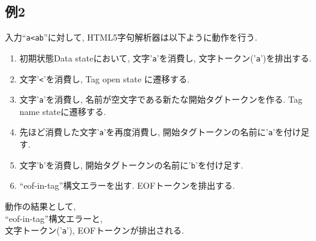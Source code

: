 \documentclass[uplatex,a4j]{jsreport}
\begin{document}
\subsection{例2}
入力``\texttt{a<ab}''に対して, HTML5字句解析器は以下ように動作を行う.\\
\begin{enumerate}
    \item 初期状態Data stateにおいて, 文字'\texttt{a}'を消費し, 文字トークン('\texttt{a}')を排出する.
    \item 文字'\texttt{<}'を消費し, Tag open state に遷移する.
    \item 文字'\texttt{a}'を消費し, 名前が空文字である新たな開始タグトークンを作る. Tag name stateに遷移する.
    \item 先ほど消費した文字'\texttt{a}'を再度消費し, 開始タグトークンの名前に'\texttt{a}'を付け足す.
    \item 文字'\texttt{b}'を消費し, 開始タグトークンの名前に'\texttt{b}'を付け足す.
    \item ``eof-in-tag''構文エラーを出す. EOFトークンを排出する.
\end{enumerate}
動作の結果として,\\
``eof-in-tag''構文エラーと, \\
文字トークン('\texttt{a}'), EOFトークンが排出される.
\end{document}
